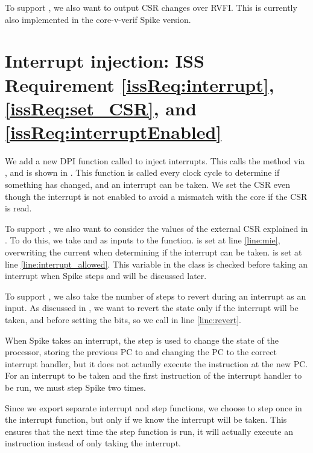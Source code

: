 To support , we also want to output CSR changes over RVFI. This is currently also implemented in the core-v-verif Spike version.

\section{Interrupt injection: ISS Requirement \ref{issReq:interrupt}, \ref{issReq:set_CSR}, and \ref{issReq:interruptEnabled}}
\label{sec:iss_interruptInjection}

We add a new DPI function called  to inject interrupts. This calls the  method via , and is shown in . This function is called every clock cycle to determine if something has changed, and an interrupt can be taken. We set the  CSR even though the interrupt is not enabled to avoid a mismatch with the core if the  CSR is read.

To support , we also want to consider the values of the external CSR explained in . To do this, we take  and  as inputs to the function.  is set at line \ref{line:mie}, overwriting the current  when determining if the interrupt can be taken.  is set at line \ref{line:interrupt_allowed}. This variable in the  class is checked before taking an interrupt when Spike steps and will be discussed later.

To support , we also take the number of steps to revert during an interrupt as an input. As discussed in , we want to revert the state only if the interrupt will be taken, and before setting the  bits, so we call  in line \ref{line:revert}.

When Spike takes an interrupt, the step is used to change the state of the processor, storing the previous PC to  and changing the PC to the correct interrupt handler, but it does not actually execute the instruction at the new PC. For an interrupt to be taken and the first instruction of the interrupt handler to be run, we must step Spike two times. 

Since we export separate interrupt and step functions, we choose to step once in the interrupt function, but only if we know the interrupt will be taken. This ensures that the next time the step function is run, it will actually execute an instruction instead of only taking the interrupt. 

